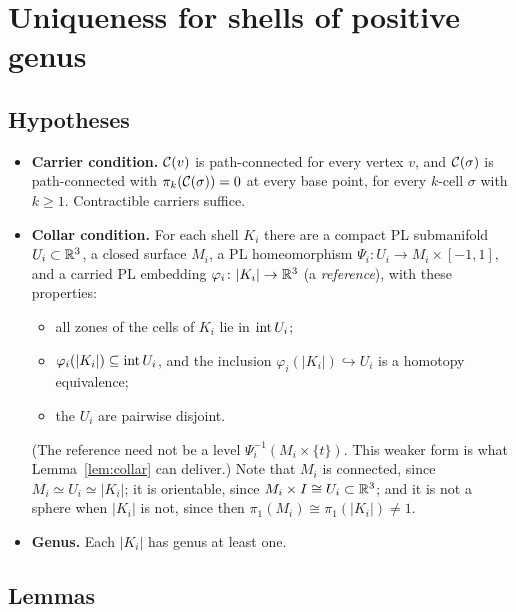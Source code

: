 \section{Uniqueness for shells of positive genus}\label{sec:uniqueness}

\subsection{Hypotheses}
\begin{itemize}
\item \textbf{Carrier condition.} $\mathcal{C}(v)$ is path-connected for every vertex $v$, and $\mathcal{C}(\sigma)$ is path-connected
with $\pi_k(\mathcal{C}(\sigma))=0$ at every base point, for every $k$-cell $\sigma$ with $k\ge1$. Contractible carriers suffice.
\item \textbf{Collar condition.} For each shell $K_i$ there are a compact PL submanifold $U_i\subset\mathbb{R}^3$, a
closed surface $M_i$, a PL homeomorphism $\Psi_i\colon U_i\to M_i\times[-1,1]$, and a carried PL embedding
$\varphi_i\colon|K_i|\to\mathbb{R}^3$ (a \emph{reference}), with these properties:
  \begin{itemize}
  \item all zones of the cells of $K_i$ lie in $\operatorname{int} U_i$;
  \item $\varphi_i(|K_i|)\subseteq\operatorname{int} U_i$, and the inclusion $\varphi_i(|K_i|)\hookrightarrow U_i$ is a homotopy
  equivalence;
  \item the $U_i$ are pairwise disjoint.
  \end{itemize}
  (The reference need not be a level $\Psi_i^{-1}(M_i\times\{t\})$. This weaker form is what
  Lemma~\ref{lem:collar} can deliver.) Note that $M_i$ is connected, since $M_i\simeq U_i\simeq|K_i|$; it is
  orientable, since $M_i\times I\cong U_i\subset\mathbb{R}^3$; and it is not a sphere when $|K_i|$ is not, since then $\pi_1(M_i)\cong\pi_1(|K_i|)\ne1$.
\item \textbf{Genus.} Each $|K_i|$ has genus at least one.
\end{itemize}

\subsection{Lemmas}

